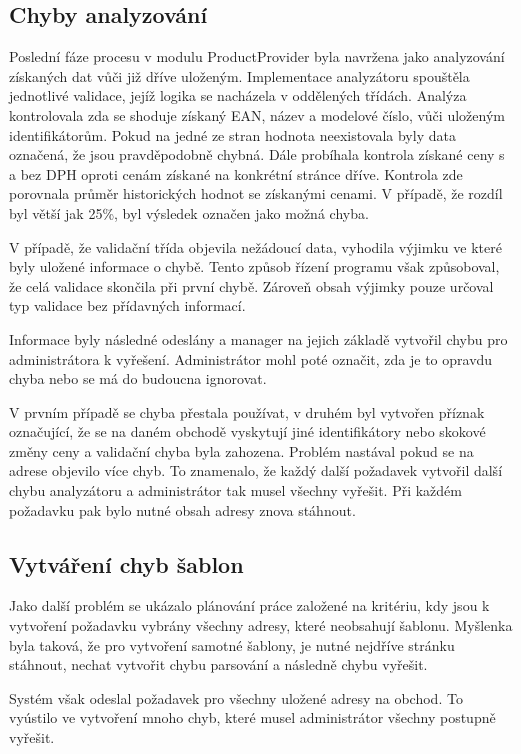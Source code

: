 \documentclass[thesis=B,czech]{FITthesis}[2012/06/26]
\begin{document}
\subsection{Chyby analyzování}
Poslední fáze procesu v modulu ProductProvider byla navržena jako analyzování získaných dat vůči již dříve uloženým. Implementace analyzátoru 
spouštěla jednotlivé validace, jejíž logika se nacházela v oddělených třídách. 
Analýza kontrolovala zda se shoduje získaný EAN, název a modelové číslo, vůči uloženým identifikátorům. Pokud na jedné ze stran hodnota neexistovala
byly data označená, že jsou pravděpodobně chybná. Dále probíhala kontrola získané ceny s a bez DPH oproti cenám získané na konkrétní stránce dříve.
Kontrola zde porovnala průměr historických hodnot se získanými cenami. V případě, že rozdíl byl větší jak 25\%, byl výsledek označen jako
možná chyba.
\par
V případě, že validační třída objevila nežádoucí data,
vyhodila výjimku ve které byly uložené informace o chybě. Tento způsob řízení programu však způsoboval, že celá validace skončila při první chybě.
Zároveň obsah výjimky pouze určoval typ validace bez přídavných informací.
\par
Informace byly následné odeslány a manager na jejich základě vytvořil chybu pro administrátora k vyřešení. Administrátor mohl 
poté označit, zda je to opravdu chyba nebo se má do budoucna ignorovat.
\par
V prvním případě se chyba přestala používat, v druhém byl vytvořen příznak označující, že se na daném obchodě vyskytují jiné identifikátory
nebo skokové změny ceny a validační chyba byla zahozena. Problém nastával pokud se na adrese objevilo více chyb. To znamenalo, že každý další požadavek vytvořil další
chybu analyzátoru a administrátor tak musel všechny vyřešit. Při každém požadavku pak bylo nutné obsah adresy znova stáhnout.

\subsection{Vytváření chyb šablon}
Jako další problém se ukázalo plánování práce založené na kritériu, kdy jsou k vytvoření požadavku vybrány všechny adresy, které neobsahují šablonu.
Myšlenka byla taková, že pro vytvoření samotné šablony, je nutné nejdříve stránku stáhnout, nechat vytvořit chybu parsování
a následně chybu vyřešit.
\par
Systém však odeslal požadavek pro všechny uložené adresy na obchod. To vyústilo ve vytvoření mnoho chyb, 
které musel administrátor všechny postupně vyřešit.
\par
\end{document}
